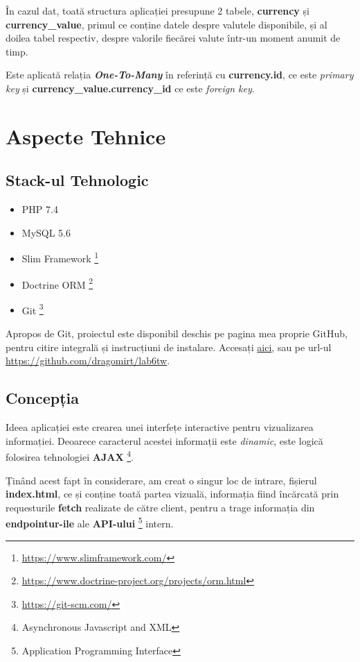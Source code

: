 \documentclass[12pt. a4paper]{report}
\begin{document}
În cazul dat, toată structura aplicației presupune 2 tabele, \textbf{currency} și \textbf{currency\_value}, primul ce conține datele despre valutele disponibile, și al doilea tabel respectiv, despre valorile fiecărei valute într-un moment anumit de timp.

Este aplicată relația \emph{\textbf{One-To-Many}} în referință cu \textbf{currency.id}, ce este \emph{primary key} și \textbf{currency\_value.currency\_id} ce este \emph{foreign key}.

\chapter{Aspecte Tehnice}

\section{Stack-ul Tehnologic}
\begin{itemize}
	\item PHP 7.4
	\item MySQL 5.6
	\item Slim Framework \footnote{\url{https://www.slimframework.com/}}
	\item Doctrine ORM \footnote{\url{https://www.doctrine-project.org/projects/orm.html}}
	\item Git \footnote{\url{https://git-scm.com/}}
\end{itemize}

Apropos de Git, proiectul este disponibil deschis pe pagina mea proprie GitHub, pentru citire integrală și instrucțiuni de instalare. Accesați \href{https://github.com/dragomirt/lab6tw}{aici}, sau pe url-ul \url{https://github.com/dragomirt/lab6tw}.

\section{Concepția}
Ideea aplicației este crearea unei interfețe interactive pentru vizualizarea informației. Deoarece caracterul acestei informații este 
\emph{dinamic}, este logică folosirea tehnologiei \textbf{AJAX} \footnote{Asynchronous Javascript and XML}. 

Ținând acest fapt în considerare, am creat o singur loc de intrare, fișierul \textbf{index.html}, ce și conține toată partea vizuală, informația fiind încărcată prin requesturile \textbf{fetch} realizate de către client, pentru a trage informația din \textbf{endpointur-ile} ale \textbf{API-ului} \footnote{Application Programming Interface} intern.
\end{document}

